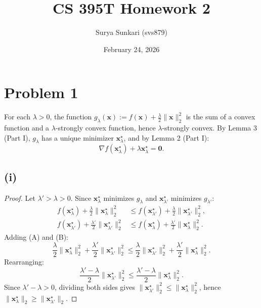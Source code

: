 \documentclass[12pt]{article}
\begin{document}
\title{CS 395T Homework 2}
\author{Surya Sunkari (svs879)}
\date{February 24, 2026}

\maketitle

\section*{Problem 1}

For each $\lambda > 0$, the function $g_\lambda(\mathbf{x}) := f(\mathbf{x}) + \frac{\lambda}{2}\|\mathbf{x}\|_2^2$ is the sum of a convex function and a $\lambda$-strongly convex function, hence $\lambda$-strongly convex. By Lemma 3 (Part I), $g_\lambda$ has a unique minimizer $\mathbf{x}_\lambda^\star$, and by Lemma 2 (Part I):
\[
\nabla f(\mathbf{x}_\lambda^\star) + \lambda \mathbf{x}_\lambda^\star = \mathbf{0}.
\]

\subsection*{(i)}

\begin{proof}
Let $\lambda' > \lambda > 0$. Since $\mathbf{x}_\lambda^\star$ minimizes $g_\lambda$ and $\mathbf{x}_{\lambda'}^\star$ minimizes $g_{\lambda'}$:
\begin{align*}
f(\mathbf{x}_\lambda^\star) + \frac{\lambda}{2}\|\mathbf{x}_\lambda^\star\|_2^2 &\leq f(\mathbf{x}_{\lambda'}^\star) + \frac{\lambda}{2}\|\mathbf{x}_{\lambda'}^\star\|_2^2, \tag{A} \\
f(\mathbf{x}_{\lambda'}^\star) + \frac{\lambda'}{2}\|\mathbf{x}_{\lambda'}^\star\|_2^2 &\leq f(\mathbf{x}_\lambda^\star) + \frac{\lambda'}{2}\|\mathbf{x}_\lambda^\star\|_2^2. \tag{B}
\end{align*}
Adding (A) and (B):
\[
\frac{\lambda}{2}\|\mathbf{x}_\lambda^\star\|_2^2 + \frac{\lambda'}{2}\|\mathbf{x}_{\lambda'}^\star\|_2^2 \leq \frac{\lambda}{2}\|\mathbf{x}_{\lambda'}^\star\|_2^2 + \frac{\lambda'}{2}\|\mathbf{x}_\lambda^\star\|_2^2.
\]
Rearranging:
\[
\frac{\lambda' - \lambda}{2}\|\mathbf{x}_{\lambda'}^\star\|_2^2 \leq \frac{\lambda' - \lambda}{2}\|\mathbf{x}_\lambda^\star\|_2^2.
\]
Since $\lambda' - \lambda > 0$, dividing both sides gives $\|\mathbf{x}_{\lambda'}^\star\|_2^2 \leq \|\mathbf{x}_\lambda^\star\|_2^2$, hence $\|\mathbf{x}_\lambda^\star\|_2 \geq \|\mathbf{x}_{\lambda'}^\star\|_2$.
\end{proof}
\end{document}
